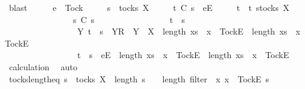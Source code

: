 \ blast\isanewline
\ \ \isamarkupfalse%
\ \isamarkupfalse%
\ {\isachardoublequoteopen}e\ {\isasymnoteq}\ Tock\ {\isasymLongrightarrow}\isanewline
\ \ \ \ s\ {\isasymin}\ tocks\ X\ {\isasymLongrightarrow}\isanewline
\ \ \ \ t\ {\isasymlesssim}\isactrlsub C\ s\ {\isacharat}\ {\isacharbrackleft}{\isacharbrackleft}e{\isacharbrackright}\isactrlsub E{\isacharbrackright}\ {\isasymLongrightarrow}\isanewline
\ \ \ \ t\ {\isasymin}\ {\isacharbraceleft}t{\isachardot}\ {\isasymexists}s{\isacharprime}{\isasymin}tocks\ X{\isachardot}\isanewline
\ \ \ \ \ \ \ \ \ \ \ \ \ \ \ \ s{\isacharprime}\ {\isasymlesssim}\isactrlsub C\ s\ {\isasymand}\isanewline
\ \ \ \ \ \ \ \ \ \ \ \ \ \ \ \ {\isacharparenleft}t\ {\isacharequal}\ s{\isacharprime}\ {\isasymor}\isanewline
\ \ \ \ \ \ \ \ \ \ \ \ \ \ \ \ \ {\isacharparenleft}{\isasymexists}Y{\isachardot}\ t\ {\isacharequal}\ s{\isacharprime}\ {\isacharat}\ {\isacharbrackleft}{\isacharbrackleft}Y{\isacharbrackright}\isactrlsub R{\isacharbrackright}\ {\isasymand}\ Y\ {\isasymsubseteq}\ X\ {\isasymand}\ length\ {\isacharbrackleft}x{\isasymleftarrow}s{\isacharprime}\ {\isachardot}\ x\ {\isacharequal}\ {\isacharbrackleft}Tock{\isacharbrackright}\isactrlsub E{\isacharbrackright}\ {\isacharless}\ length\ {\isacharbrackleft}x{\isasymleftarrow}s\ {\isachardot}\ x\ {\isacharequal}\ {\isacharbrackleft}Tock{\isacharbrackright}\isactrlsub E{\isacharbrackright}{\isacharparenright}\ {\isasymor}\isanewline
\ \ \ \ \ \ \ \ \ \ \ \ \ \ \ \ \ t\ {\isacharequal}\ s{\isacharprime}\ {\isacharat}\ {\isacharbrackleft}{\isacharbrackleft}e{\isacharbrackright}\isactrlsub E{\isacharbrackright}\ {\isasymand}\ length\ {\isacharbrackleft}x{\isasymleftarrow}s{\isacharprime}\ {\isachardot}\ x\ {\isacharequal}\ {\isacharbrackleft}Tock{\isacharbrackright}\isactrlsub E{\isacharbrackright}\ {\isacharequal}\ length\ {\isacharbrackleft}x{\isasymleftarrow}s\ {\isachardot}\ x\ {\isacharequal}\ {\isacharbrackleft}Tock{\isacharbrackright}\isactrlsub E{\isacharbrackright}{\isacharparenright}{\isacharbraceright}{\isachardoublequoteclose}\isanewline
\ \ \ \ \isamarkupfalse%
\ calculation\ \isamarkupfalse%
\ auto\isanewline
{}\isamarkupfalse%
%
\endisatagproof
{\isafoldproof}%
%
\isadelimproof
\isanewline
%
\endisadelimproof
\isanewline
{}\isamarkupfalse%
\ tocks{\isacharunderscore}length{\isacharunderscore}eq{\isacharcolon}\ {\isachardoublequoteopen}s\ {\isasymin}\ tocks\ X\ {\isasymLongrightarrow}\ length\ s\ {\isacharequal}\ {}\ {\isacharasterisk}\ length\ {\isacharparenleft}filter\ {\isacharparenleft}{\isasymlambda}\ x{\isachardot}\ x\ {\isacharequal}\ {\isacharbrackleft}Tock{\isacharbrackright}\isactrlsub E{\isacharparenright}\ s{\isacharparenright}{\isachardoublequoteclose}\isanewline
